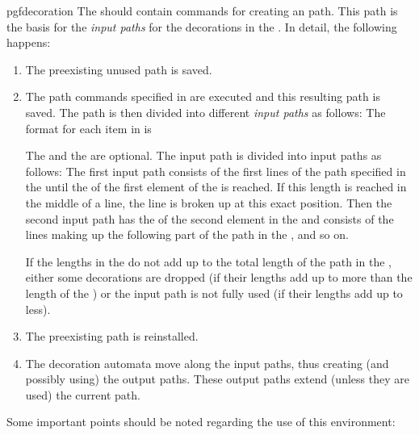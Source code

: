\begin{environment}{{pgfdecoration}}
  The  should contain commands for creating
  an path. This path is the basis for the \emph{input paths}
  for the decorations in the . In detail, the
  following happens:
  \begin{enumerate}
  \item
    The preexisting unused path is saved.
  \item
    The path commands specified in  are
    executed and this resulting path is saved. The path is then
    divided into different \emph{input paths} as follows:
    The format for each item in  is
    \begin{quote}
    \end{quote}
    The  and the  are optional. The
    input path is divided into input paths as follows: The first input
    path consists of the first lines of the path specified in the
     until the   of the first
    element of the  is reached. If this length
    is reached in the middle of a line, the line is broken up at this
    exact position. Then the second input path has the 
    of the second element in the  and consists
    of the lines making up the following  part of the
    path in the , and so on.

    If the lengths in the 
    do not add up to the total length of the path in the
    , either some  decorations are dropped
    (if their lengths add up to more than the length of the
    ) or
    the input path is not fully used (if their lengths  add up to less).
  \item
    The preexisting path is reinstalled.
  \item
    The decoration automata move along the input paths, thus creating
    (and  possibly using) the output paths. These output paths extend
    (unless they are used) the current path.
  \end{enumerate}
	
  Some important points should be noted regarding the use of this
  environment:


\end{environment}
